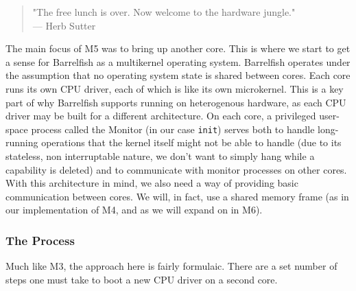 \begin{quote}
"The free lunch is over. Now welcome to the hardware jungle." \\
\hspace*{\fill} — Herb Sutter 
\end{quote}

The main focus of M5 was to bring up another core. This is where we start to get a sense for Barrelfish as a multikernel operating system. Barrelfish operates under the assumption that no operating  system state is shared between cores. Each core runs its own CPU driver, each of which is like its own microkernel. This is a key part of why Barrelfish supports running on heterogenous hardware, as each CPU driver may be built for a different architecture. On each core, a privileged user-space process called the Monitor (in our case \verb|init|) serves both to handle long-running operations that the kernel itself might not be able to handle (due to its stateless, non interruptable nature, we don't want to simply hang while a capability is deleted) and to communicate with monitor processes on other cores. With this architecture in mind, we also need a way of providing basic communication between cores. We will, in fact, use a shared memory frame (as in our implementation of M4, and as we will expand on in M6).

\subsubsection*{The Process} \label{sec:m5_process}

Much like M3, the approach here is fairly formulaic. There are a set number of steps one must take to boot a new CPU driver on a second core. 

